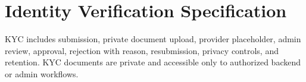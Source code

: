 \chapter{Identity Verification Specification}
KYC includes submission, private document upload, provider placeholder, admin review, approval, rejection with reason, resubmission, privacy controls, and retention. KYC documents are private and accessible only to authorized backend or admin workflows.
